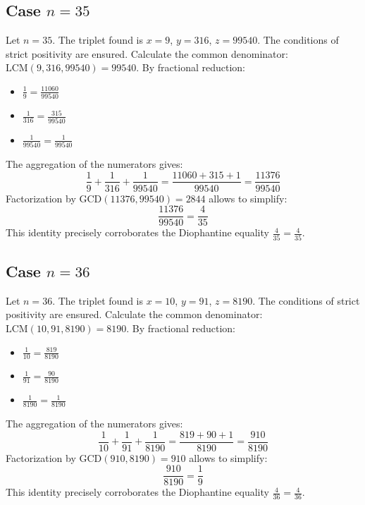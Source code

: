 \documentclass[11pt,a4paper]{article}
\begin{document}
\subsection{Case $n = 35$}
Let $n = 35$. The triplet found is $x = 9$, $y = 316$, $z = 99540$.
The conditions of strict positivity are ensured.
Calculate the common denominator: $\text{LCM}(9, 316, 99540) = 99540$.
By fractional reduction:
\begin{itemize}
    \item $\frac{1}{9} = \frac{11060}{99540}$
    \item $\frac{1}{316} = \frac{315}{99540}$
    \item $\frac{1}{99540} = \frac{1}{99540}$
\end{itemize}
The aggregation of the numerators gives:
$$ \frac{1}{9} + \frac{1}{316} + \frac{1}{99540} = \frac{11060 + 315 + 1}{99540} = \frac{11376}{99540} $$
Factorization by $\text{GCD}(11376, 99540) = 2844$ allows to simplify:
$$ \frac{11376}{99540} = \frac{4}{35} $$
This identity precisely corroborates the Diophantine equality $\frac{4}{35} = \frac{4}{35}$.

\subsection{Case $n = 36$}
Let $n = 36$. The triplet found is $x = 10$, $y = 91$, $z = 8190$.
The conditions of strict positivity are ensured.
Calculate the common denominator: $\text{LCM}(10, 91, 8190) = 8190$.
By fractional reduction:
\begin{itemize}
    \item $\frac{1}{10} = \frac{819}{8190}$
    \item $\frac{1}{91} = \frac{90}{8190}$
    \item $\frac{1}{8190} = \frac{1}{8190}$
\end{itemize}
The aggregation of the numerators gives:
$$ \frac{1}{10} + \frac{1}{91} + \frac{1}{8190} = \frac{819 + 90 + 1}{8190} = \frac{910}{8190} $$
Factorization by $\text{GCD}(910, 8190) = 910$ allows to simplify:
$$ \frac{910}{8190} = \frac{1}{9} $$
This identity precisely corroborates the Diophantine equality $\frac{4}{36} = \frac{4}{36}$.
\end{document}
